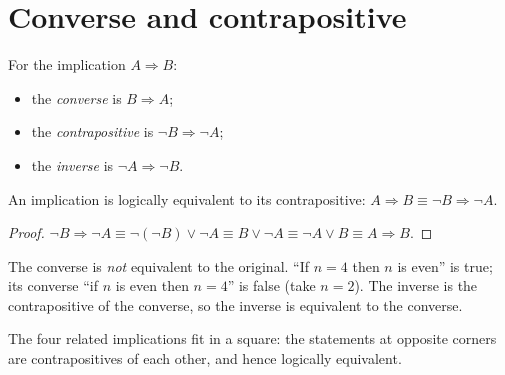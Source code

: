 \section{Converse and contrapositive}

\begin{definition}
For the implication $A \Rightarrow B$:
\begin{itemize}
  \item the \emph{converse} is $B \Rightarrow A$;
  \item the \emph{contrapositive} is $\neg B \Rightarrow \neg A$;
  \item the \emph{inverse} is $\neg A \Rightarrow \neg B$.
\end{itemize}
\end{definition}

\begin{theorem}
An implication is logically equivalent to its contrapositive:
$A \Rightarrow B \equiv \neg B \Rightarrow \neg A$.
\end{theorem}

\begin{proof}
$\neg B \Rightarrow \neg A \equiv \neg(\neg B) \vee \neg A \equiv B \vee \neg A \equiv
\neg A \vee B \equiv A \Rightarrow B$.
\end{proof}

\begin{important}
The converse is \emph{not} equivalent to the original. ``If $n = 4$ then $n$ is even'' is
true; its converse ``if $n$ is even then $n = 4$'' is false (take $n = 2$).
The inverse is the contrapositive of the converse, so the inverse is equivalent to the
converse.
\end{important}

The four related implications fit in a square: the statements at opposite corners are
contrapositives of each other, and hence logically equivalent.

